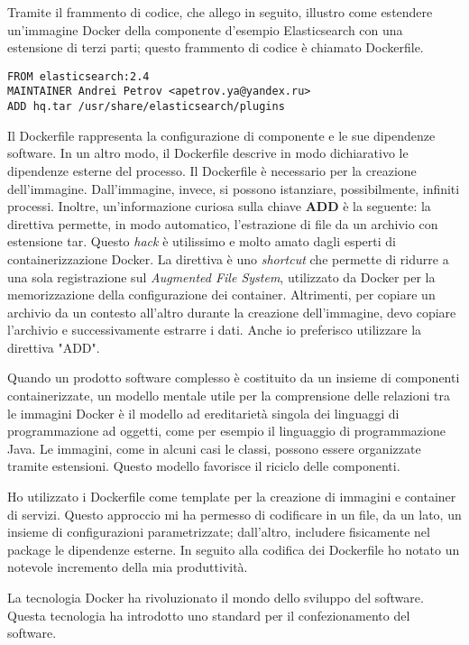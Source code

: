 Tramite il frammento di codice, che allego in seguito, illustro 
come estendere un'immagine Docker della componente d'esempio 
Elasticsearch con una estensione di terzi parti; 
questo frammento di codice è chiamato Dockerfile.

\begin{verbatim}
FROM elasticsearch:2.4
MAINTAINER Andrei Petrov <apetrov.ya@yandex.ru>
ADD hq.tar /usr/share/elasticsearch/plugins
\end{verbatim}

Il Dockerfile rappresenta la configurazione 
di componente e le sue dipendenze software. 
In un altro modo, il Dockerfile descrive 
in modo dichiarativo le dipendenze esterne 
del processo. Il Dockerfile è necessario per 
la creazione dell'immagine. Dall'immagine, invece, 
si possono istanziare, possibilmente, infiniti processi. 
Inoltre, un'informazione curiosa sulla chiave \textbf{ADD}
è la seguente: la direttiva permette, in modo automatico,
l'estrazione di file da un archivio con estensione tar.
Questo \textit{hack} è utilissimo e molto amato
dagli esperti di containerizzazione Docker. 
La direttiva è uno \textit{shortcut} che 
permette di ridurre a una sola registrazione sul 
\textit{Augmented File System}, utilizzato da Docker
per la memorizzazione della configurazione dei container. 
Altrimenti, per copiare un archivio da un contesto 
all'altro durante la creazione dell'immagine, devo
copiare l'archivio e successivamente estrarre i dati.
Anche io preferisco utilizzare la direttiva "ADD".

Quando un prodotto software complesso è costituito da 
un insieme di componenti containerizzate, un modello 
mentale utile per la comprensione delle relazioni tra 
le immagini Docker è il modello ad ereditarietà singola 
dei linguaggi di programmazione ad oggetti, come per
esempio il linguaggio di programmazione Java.
Le immagini, come in alcuni casi le classi, 
possono essere organizzate tramite estensioni.
Questo modello favorisce il riciclo delle 
componenti.

Ho utilizzato i Dockerfile come template 
per la creazione di immagini e container di servizi. 
Questo approccio mi ha permesso di codificare in un file, 
da un lato, un insieme di configurazioni parametrizzate;
dall'altro, includere fisicamente nel package
le dipendenze esterne. In seguito alla codifica dei Dockerfile
ho notato un notevole incremento della mia produttività.

La tecnologia Docker ha rivoluzionato il mondo dello 
sviluppo del software. Questa tecnologia ha introdotto 
uno standard per il confezionamento del software.

